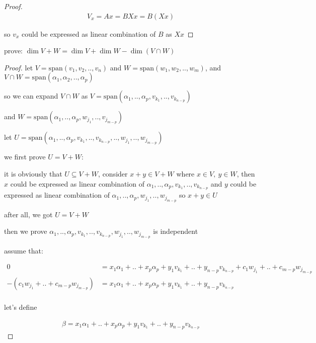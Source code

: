 \begin{proof}
   \begin{align*}
        V_x = Ax = BXx = B(Xx)
   \end{align*} 

   so $v_x$ could be expressed as linear combination of $B$ as $Xx$
\end{proof}

\begin{exercise}
    prove: $\dim V + W = \dim V + \dim W - \dim (V \cap W)$
\end{exercise}

\begin{proof}
    let $V = \mathrm{span}(v_1, v_2, .., v_n)$ and $W = \mathrm{span}(w_1, w_2, .., w_m)$, and $V \cap W = \mathrm{span}(\alpha_1, \alpha_2,..,\alpha_p)$ 

    so we can expand $V \cap W$ as $V = \mathrm{span}(\alpha_1,.., \alpha_p, v_{k_1}, .., v_{k_{n-p}})$

    and $W = \mathrm{span}(\alpha_1,.., \alpha_p, w_{j_1}, .., v_{j_{m-p}})$

    let $U = \mathrm{span}(\alpha_1,..,\alpha_p, v_{k_1},..,v_{k_{n-p}}, .., w_{j_1}, ..,w_{j_{m-p}})$

    we first prove $U = V + W$:

    it is obviously that $U \subseteq V + W$, consider $x + y \in V + W$ where $x \in V,\: y \in W$, then $x$
    could be expressed as linear combination of $\alpha_1,..,\alpha_p,v_{k_1},..,v_{k_{n-p}}$  and $y$
    could be expressed as linear combination of $\alpha_1,..,\alpha_p,w_{j_1},..,w_{j_{m-p}}$ so $x + y \in U$

    after all, we got $U = V + W$

    then we prove $\alpha_1,..,\alpha_p, v_{k_1},..,v_{k_{n-p}}, w_{j_1},..,w_{j_{m-p}}$ is independent

    assume that:

    \begin{align*}
    0 &= x_1\alpha_1+.. + x_p\alpha_p + y_1v_{k_1} + .. + y_{n-p}v_{k_{n-p}} + c_1w_{j_1} + .. + c_{m-p}w_{j_{m-p}} \\
    -(c_1w_{j_1} + .. + c_{m-p}w_{j_{m-p}}) &= x_1\alpha_1+.. + x_p\alpha_p + y_1v_{k_1} + .. + y_{n-p}v_{k_{n-p}} \\
    \end{align*}

    let's define

    \begin{align*}
        \beta = x_1\alpha_1+.. + x_p\alpha_p + y_1v_{k_1} + .. + y_{n-p}v_{k_{n-p}}
    \end{align*}


\end{proof}
